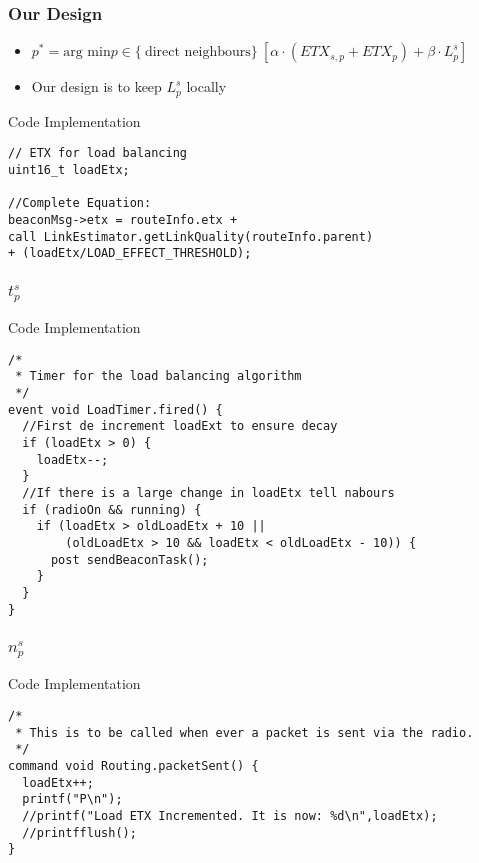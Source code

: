 \documentclass{beamer}
\begin{document}
\begin{frame}[fragile]
  \frametitle{Our Design}
  \begin{itemize}
    \item $p^* = \text{arg min}  p \in \{\ \text{direct neighbours} \}\
                 [\alpha  \cdot (ETX_{s,p} + ETX_p) + \beta \cdot L_p^s]$

    \item Our design is to keep $L_p^s$ locally
  \end{itemize} 
   
  \footnotesize{
  \begin{block}{Code Implementation}
    \begin{verbatim}
// ETX for load balancing                                                                                                                                                              
uint16_t loadEtx;

//Complete Equation:
beaconMsg->etx = routeInfo.etx + 
call LinkEstimator.getLinkQuality(routeInfo.parent) 
+ (loadEtx/LOAD_EFFECT_THRESHOLD);
    \end{verbatim}
  \end{block}
}
\end{frame}

\begin{frame}[fragile]
  \frametitle{$t_p^s$}
  \footnotesize{
    \begin{block}{Code Implementation}
      \begin{verbatim}
/* 
 * Timer for the load balancing algorithm
 */
event void LoadTimer.fired() {
  //First de increment loadExt to ensure decay
  if (loadEtx > 0) {
    loadEtx--;
  }
  //If there is a large change in loadEtx tell nabours
  if (radioOn && running) {
    if (loadEtx > oldLoadEtx + 10 || 
        (oldLoadEtx > 10 && loadEtx < oldLoadEtx - 10)) {
      post sendBeaconTask();
    }
  }
}
      \end{verbatim}
    \end{block}
  }
\end{frame}

\begin{frame}[fragile]
  \frametitle{$n_p^s$}
  \footnotesize{
    \begin{block}{Code Implementation}
      \begin{verbatim}
/*
 * This is to be called when ever a packet is sent via the radio.
 */
command void Routing.packetSent() {
  loadEtx++;
  printf("P\n");
  //printf("Load ETX Incremented. It is now: %d\n",loadEtx);
  //printfflush();
}
      \end{verbatim}
    \end{block}
  }
\end{frame}
\end{document}
